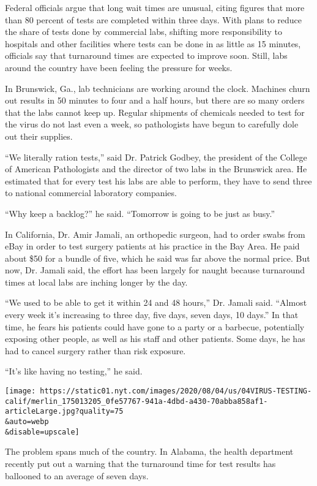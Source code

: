 Federal officials argue that long wait times are unusual, citing figures
that more than 80 percent of tests are completed within three days. With
plans to reduce the share of tests done by commercial labs, shifting
more responsibility to hospitals and other facilities where tests can be
done in as little as 15 minutes, officials say that turnaround times are
expected to improve soon. Still, labs around the country have been
feeling the pressure for weeks.

In Brunswick, Ga., lab technicians are working around the clock.
Machines churn out results in 50 minutes to four and a half hours, but
there are so many orders that the labs cannot keep up. Regular shipments
of chemicals needed to test for the virus do not last even a week, so
pathologists have begun to carefully dole out their supplies.

``We literally ration tests,'' said Dr. Patrick Godbey, the president of
the College of American Pathologists and the director of two labs in the
Brunswick area. He estimated that for every test his labs are able to
perform, they have to send three to national commercial laboratory
companies.

``Why keep a backlog?'' he said. ``Tomorrow is going to be just as
busy.''

In California, Dr. Amir Jamali, an orthopedic surgeon, had to order
swabs from eBay in order to test surgery patients at his practice in the
Bay Area. He paid about \$50 for a bundle of five, which he said was far
above the normal price. But now, Dr. Jamali said, the effort has been
largely for naught because turnaround times at local labs are inching
longer by the day.

``We used to be able to get it within 24 and 48 hours,'' Dr. Jamali
said. ``Almost every week it's increasing to three day, five days, seven
days, 10 days.'' In that time, he fears his patients could have gone to
a party or a barbecue, potentially exposing other people, as well as his
staff and other patients. Some days, he has had to cancel surgery rather
than risk exposure.

``It's like having no testing,'' he said.

\texttt{[image: https://static01.nyt.com/images/2020/08/04/us/04VIRUS-TESTING-calif/merlin\_175013205\_0fe57767-941a-4dbd-a430-70abba858af1-articleLarge.jpg?quality=75\\\&auto=webp\\\&disable=upscale]}

The problem spans much of the country. In Alabama, the health department
recently put out a warning that the turnaround time for test results has
ballooned to an average of seven days.

